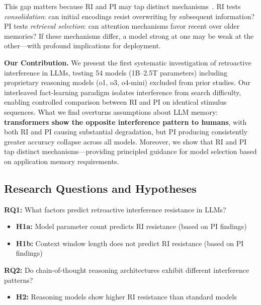 \documentclass{article}
\begin{document}
This gap matters because RI and PI may tap distinct mechanisms~\citep{wixted2004consolidation}. RI tests \textit{consolidation}: can initial encodings resist overwriting by subsequent information? PI tests \textit{retrieval selection}: can attention mechanisms favor recent over older memories? If these mechanisms differ, a model strong at one may be weak at the other---with profound implications for deployment.

\textbf{Our Contribution.} We present the first systematic investigation of retroactive interference in LLMs, testing 54 models (1B--2.5T parameters) including proprietary reasoning models (o1, o3, o4-mini) excluded from prior studies. Our interleaved fact-learning paradigm isolates interference from search difficulty, enabling controlled comparison between RI and PI on identical stimulus sequences. What we find overturns assumptions about LLM memory: \textbf{transformers show the opposite interference pattern to humans}, with both RI and PI causing substantial degradation, but PI producing consistently greater accuracy collapse across all models. Moreover, we show that RI and PI tap distinct mechanisms---providing principled guidance for model selection based on application memory requirements.

\subsection{Research Questions and Hypotheses}

\textbf{RQ1:} What factors predict retroactive interference resistance in LLMs?
\begin{itemize}[itemsep=2pt,topsep=3pt,parsep=0pt]
    \item \textbf{H1a:} Model parameter count predicts RI resistance (based on PI findings)
    \item \textbf{H1b:} Context window length does not predict RI resistance (based on PI findings)
\end{itemize}
\vspace{-3pt}

\textbf{RQ2:} Do chain-of-thought reasoning architectures exhibit different interference patterns?
\begin{itemize}[itemsep=2pt,topsep=3pt,parsep=0pt]
    \item \textbf{H2:} Reasoning models show higher RI resistance than standard models
\end{itemize}
\vspace{-3pt}
\end{document}

